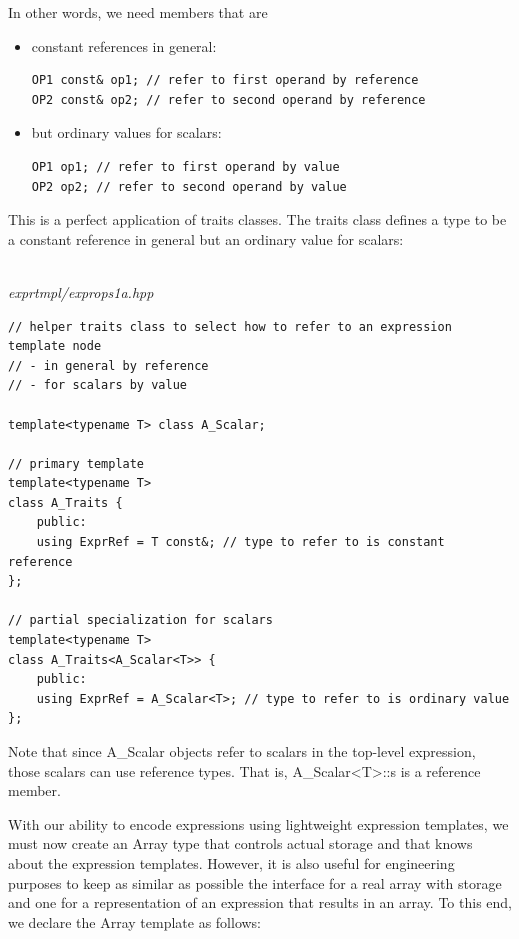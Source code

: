 In other words, we need members that are

\begin{itemize}
\item 
constant references in general:
\begin{lstlisting}[style=styleCXX]
OP1 const& op1; // refer to first operand by reference
OP2 const& op2; // refer to second operand by reference
\end{lstlisting}

\item 
but ordinary values for scalars:
\begin{lstlisting}[style=styleCXX]
OP1 op1; // refer to first operand by value
OP2 op2; // refer to second operand by value
\end{lstlisting}
\end{itemize}

This is a perfect application of traits classes. The traits class defines a type to be a constant reference in general but an ordinary value for scalars:

\hspace*{\fill} \\ %
\noindent
\textit{exprtmpl/exprops1a.hpp}
\begin{lstlisting}[style=styleCXX]
// helper traits class to select how to refer to an expression template node
// - in general by reference
// - for scalars by value

template<typename T> class A_Scalar;

// primary template
template<typename T>
class A_Traits {
	public:
	using ExprRef = T const&; // type to refer to is constant reference
};

// partial specialization for scalars
template<typename T>
class A_Traits<A_Scalar<T>> {
	public:
	using ExprRef = A_Scalar<T>; // type to refer to is ordinary value
};
\end{lstlisting}

Note that since A\_Scalar objects refer to scalars in the top-level expression, those scalars can use reference types. That is, A\_Scalar<T>::s is a reference member.


With our ability to encode expressions using lightweight expression templates, we must now create an Array type that controls actual storage and that knows about the expression templates. However, it is also useful for engineering purposes to keep as similar as possible the interface for a real array with storage and one for a representation of an expression that results in an array. To this end, we declare the Array template as follows:

